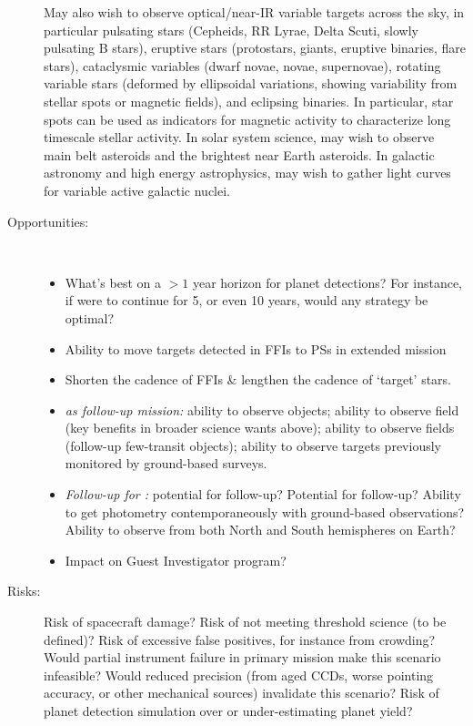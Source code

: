 \begin{description}
	May also wish to observe optical/near-IR variable targets across the sky, in particular 
	pulsating stars (Cepheids, RR Lyrae, Delta Scuti, slowly pulsating B stars),
	eruptive stars (protostars, giants, eruptive binaries, flare stars), 
	cataclysmic variables (dwarf novae, novae, supernovae), 
	rotating variable stars (deformed by ellipsoidal variations, showing variability from stellar spots or magnetic fields),
	and eclipsing binaries.
	In particular, star spots can be used as indicators for magnetic activity to characterize long timescale stellar activity.
	In solar system science, may wish to observe main belt asteroids and the brightest near Earth asteroids.
	In galactic astronomy and high energy astrophysics, may wish to gather light curves for variable active galactic nuclei.

	\item[Opportunities:]\ 
	\begin{itemize}
		\item What's best on a $>1$ year horizon for planet detections? For instance, if \tess were to continue for 5, or even 10 years, would any strategy be optimal?
		\item Ability to move targets detected in FFIs to PSs in extended mission
		\item Shorten the cadence of FFIs \& lengthen the cadence of `target' stars.
		\item \textit{\tess as follow-up mission:} 
		ability to observe \corot objects; 
		ability to observe \kepler field (key benefits in broader science wants above); 
		ability to observe \ktwo fields (follow-up \ktwo few-transit objects);
		ability to observe targets previously monitored by ground-based surveys.
		\item \textit{Follow-up for \tess:} 
		potential for \jwst follow-up? 
		Potential for \cheops follow-up? 
		Ability to get \tess photometry contemporaneously with ground-based observations?
		Ability to observe from both North and South hemispheres on Earth?
		\item Impact on Guest Investigator program?
	\end{itemize}
	
	\item[Risks:] 
	Risk of spacecraft damage? 
	Risk of not meeting threshold science (to be defined)? 
	Risk of excessive false positives, for instance from crowding? 
	Would partial instrument failure in primary mission make this scenario infeasible? 
	Would reduced precision (from aged CCDs, worse pointing accuracy, or other mechanical sources) invalidate this scenario? 
	Risk of planet detection simulation over or under-estimating planet yield?
\end{description}

